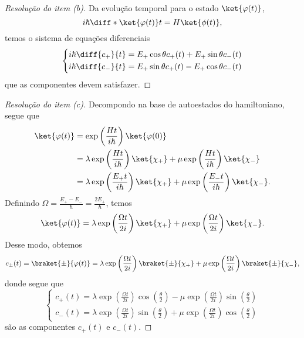 \begin{proof}[Resolução do item (b)]
    Da evolução temporal para o estado \(\ket{\varphi(t)}\),
    \begin{equation*}
        i \hbar \diff*{\ket{\varphi(t)}}{t} = H \ket{\phi(t)},
    \end{equation*}
    temos o sistema de equações diferenciais
    \begin{equation*}
        \left\{
        \begin{aligned}
            i\hbar \diff{c_+}{t} = E_+ \cos\theta c_+(t) + E_+ \sin\theta c_-(t)\\
            i\hbar \diff{c_-}{t} = E_+ \sin\theta c_+(t) - E_+ \cos\theta c_-(t)
        \end{aligned}\right.
    \end{equation*}
    que as componentes devem satisfazer.
\end{proof}
\begin{proof}[Resolução do item (c)]
    Decompondo na base de autoestados do hamiltoniano, segue que
    \begin{align*}
        \ket{\varphi(t)} &= \exp\left(\frac{Ht}{i\hbar}\right)\ket{\varphi(0)}\\
                         &= \lambda\exp\left(\frac{Ht}{i\hbar}\right)\ket{\chi_+} + \mu\exp\left(\frac{Ht}{i\hbar}\right)\ket{\chi_-}\\
                         &= \lambda\exp\left(\frac{E_+t}{i\hbar}\right)\ket{\chi_+} + \mu\exp\left(\frac{E_-t}{i\hbar}\right)\ket{\chi_-}.
    \end{align*}
    Definindo \(\Omega = \frac{E_+ - E_-}{\hbar} = \frac{2E_+}{\hbar}\), temos
    \begin{equation*}
        \ket{\varphi(t)} = \lambda\exp\left(\frac{\Omega t}{2i}\right)\ket{\chi_+} + \mu\exp\left(\frac{\Omega t}{2i}\right)\ket{\chi_-}.
    \end{equation*}
    Desse modo, obtemos
    \begin{equation*}
        c_\pm(t) = \braket{\pm}{\varphi(t)} = \lambda\exp\left(\frac{\Omega t}{2i}\right)\braket{\pm}{\chi_+} + \mu\exp\left(\frac{\Omega t}{2i}\right)\braket{\pm}{\chi_-},
    \end{equation*}
    donde segue que
    \begin{equation*}
        \left\{
        \begin{aligned}
            c_+(t) = \lambda\exp\left(\frac{\Omega t}{2i}\right)\cos\left(\frac\theta2\right) - \mu\exp\left(\frac{\Omega t}{2i}\right)\sin\left(\frac\theta2\right)\\
            c_-(t) = \lambda\exp\left(\frac{\Omega t}{2i}\right)\sin\left(\frac\theta2\right) + \mu\exp\left(\frac{\Omega t}{2i}\right)\cos\left(\frac\theta2\right)
        \end{aligned}\right.
    \end{equation*}
    são as componentes \(c_+(t)\) e \(c_-(t)\).
\end{proof}
